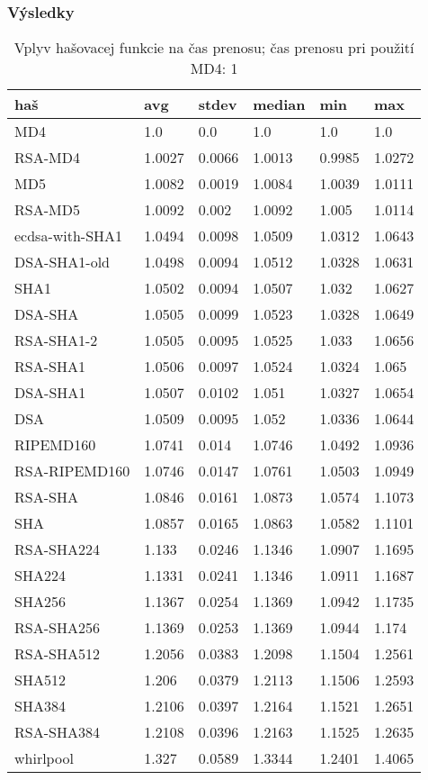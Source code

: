 \documentclass{beamer}
\begin{document}
\begin{frame}
	\frametitle{Výsledky}
	\begin{table}
		\tiny 
		\begin{tabular}{|l||l|l|l|l|l|}
			\hline
			\bf haš & \bf  avg & \bf stdev & \bf median & \bf min & \bf max \\ \hline 
MD4 & 1.0 & 0.0 & 1.0 & 1.0 & 1.0 \\ \hline
RSA-MD4 & 1.0027 & 0.0066 & 1.0013 & 0.9985 & 1.0272 \\ \hline
MD5 & 1.0082 & 0.0019 & 1.0084 & 1.0039 & 1.0111 \\ \hline
RSA-MD5 & 1.0092 & 0.002 & 1.0092 & 1.005 & 1.0114 \\ \hline
ecdsa-with-SHA1 & 1.0494 & 0.0098 & 1.0509 & 1.0312 & 1.0643 \\ \hline
DSA-SHA1-old & 1.0498 & 0.0094 & 1.0512 & 1.0328 & 1.0631 \\ \hline
SHA1 & 1.0502 & 0.0094 & 1.0507 & 1.032 & 1.0627 \\ \hline
DSA-SHA & 1.0505 & 0.0099 & 1.0523 & 1.0328 & 1.0649 \\ \hline
RSA-SHA1-2 & 1.0505 & 0.0095 & 1.0525 & 1.033 & 1.0656 \\ \hline
RSA-SHA1 & 1.0506 & 0.0097 & 1.0524 & 1.0324 & 1.065 \\ \hline
DSA-SHA1 & 1.0507 & 0.0102 & 1.051 & 1.0327 & 1.0654 \\ \hline
DSA & 1.0509 & 0.0095 & 1.052 & 1.0336 & 1.0644 \\ \hline
RIPEMD160 & 1.0741 & 0.014 & 1.0746 & 1.0492 & 1.0936 \\ \hline
RSA-RIPEMD160 & 1.0746 & 0.0147 & 1.0761 & 1.0503 & 1.0949 \\ \hline
RSA-SHA & 1.0846 & 0.0161 & 1.0873 & 1.0574 & 1.1073 \\ \hline
SHA & 1.0857 & 0.0165 & 1.0863 & 1.0582 & 1.1101 \\ \hline
RSA-SHA224 & 1.133 & 0.0246 & 1.1346 & 1.0907 & 1.1695 \\ \hline
SHA224 & 1.1331 & 0.0241 & 1.1346 & 1.0911 & 1.1687 \\ \hline
SHA256 & 1.1367 & 0.0254 & 1.1369 & 1.0942 & 1.1735 \\ \hline
RSA-SHA256 & 1.1369 & 0.0253 & 1.1369 & 1.0944 & 1.174 \\ \hline
RSA-SHA512 & 1.2056 & 0.0383 & 1.2098 & 1.1504 & 1.2561 \\ \hline
SHA512 & 1.206 & 0.0379 & 1.2113 & 1.1506 & 1.2593 \\ \hline
SHA384 & 1.2106 & 0.0397 & 1.2164 & 1.1521 & 1.2651 \\ \hline
RSA-SHA384 & 1.2108 & 0.0396 & 1.2163 & 1.1525 & 1.2635 \\ \hline
whirlpool & 1.327 & 0.0589 & 1.3344 & 1.2401 & 1.4065 \\ \hline
		\end{tabular}
		\caption{Vplyv hašovacej funkcie na čas prenosu; čas prenosu pri použití MD4: 1}
	\end{table}
\end{frame}
\end{document}
